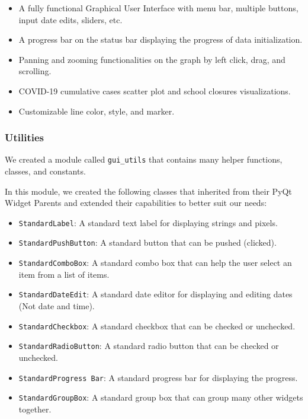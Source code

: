 \documentclass[fontsize=11pt]{article}
\begin{document}
    \begin{itemize}
        \item A fully functional Graphical User Interface with menu bar, multiple buttons, input date edits, sliders, etc.
        \item A progress bar on the status bar displaying the progress of data initialization.
        \item Panning and zooming functionalities on the graph by left click, drag, and scrolling.
        \item COVID-19 cumulative cases scatter plot and school closures visualizations.
        \item Customizable line color, style, and marker.
    \end{itemize}

    \subsubsection{Utilities}

    We created a module called \verb|gui_utils| that contains many helper functions, classes, and constants.

    In this module, we created the following classes that inherited from their PyQt Widget Parents and extended their capabilities to better suit our needs:

    \begin{itemize}
        \item \verb|StandardLabel|: A standard text label for displaying strings and pixels.
        \item \verb|StandardPushButton|: A standard button that can be pushed (clicked).
        \item \verb|StandardComboBox|: A standard combo box that can help the user select an item from a list of items.
        \item \verb|StandardDateEdit|: A standard date editor for displaying and editing dates (Not date and time).
        \item \verb|StandardCheckbox|: A standard checkbox that can be checked or unchecked.
        \item \verb|StandardRadioButton|: A standard radio button that can be checked or unchecked.
        \item \verb|StandardProgress Bar|: A standard progress bar for displaying the progress.
        \item \verb|StandardGroupBox|: A standard group box that can group many other widgets together.
    \end{itemize}
\end{document}

